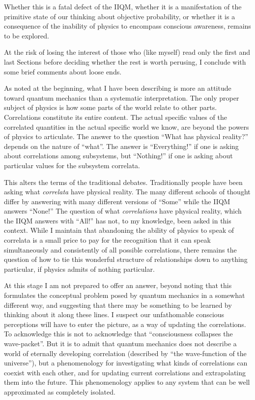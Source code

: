 Whether this is a fatal defect of the IIQM, whether it is a
manifestation of the primitive state of our thinking about objective
probability, or whether it is a consequence of the inability of
physics to encompass conscious awareness, remains to be explored.

\bigskip

\nobreak\medskip\nobreak At
the risk of losing the interest of those who (like myself) read only
the first and last Sections before deciding whether the rest is worth
perusing, I conclude with some brief comments about loose ends.

As noted at the beginning, what I have been describing is more an
attitude toward quantum mechanics than a systematic interpretation.
The only proper subject of physics is how some parts of the world
relate to other parts.  Correlations constitute its entire content.
The actual specific values of the correlated quantities in the actual
specific world we know, are beyond the powers of physics to
articulate.  The answer to the question ``What has physical reality?''
depends on the nature of ``what''.  The answer is ``Everything!'' if
one is asking about correlations among subsystems, but ``Nothing!'' if
one is asking about particular values for the subsystem correlata.  

This alters the terms of the traditional debates.  Traditionally
people have been asking what {\it correlata\/} have physical reality.
The many different schools of thought differ by answering with many
different versions of ``Some'' while the IIQM answers ``None!'' The
question of what {\it correlations\/} have physical reality, which the IIQM
answers with ``All!'' has not, to my knowledge, been asked in this
context.  While I maintain that abandoning the ability of physics
to speak of correlata is a small price to pay for the recognition that
it can speak simultaneously and consistently of all possible
correlations, there remains the question of how to tie this wonderful
structure of relationships down to anything particular, if physics
admits of nothing particular.  

At this stage I am not prepared to offer an answer, beyond noting that
this formulates the conceptual problem posed by quantum mechanics in a
somewhat different way, and suggesting that there may be something to
be learned by thinking about it along these lines.  I suspect our
unfathomable conscious perceptions will have to enter the picture, as
a way of updating the correlations.  To acknowledge this is not to
acknowledge that ``consciousness collapses the wave-packet''.  But it
is to admit that quantum mechanics does not describe a world of
eternally developing correlation (described by ``the wave-function of
the universe''), but a phenomenology for investigating what kinds of
correlations can coexist with each other, and for updating current
correlations and extrapolating them into the future.  This
phenomenology applies to any system that can be well approximated as
completely isolated.

